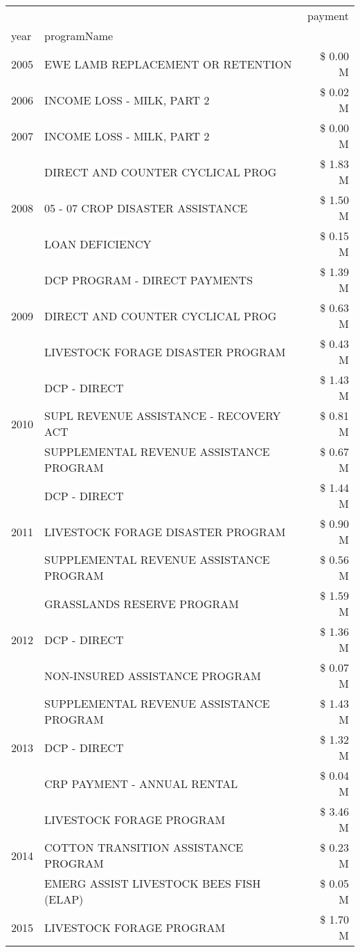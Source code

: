 \begin{tabular}{llr}
\toprule
 &  & payment \\
year & programName &  \\
\midrule
2005 & EWE LAMB REPLACEMENT OR RETENTION & \$ 0.00 M \\
\cline{1-3}
2006 & INCOME LOSS - MILK, PART 2 & \$ 0.02 M \\
\cline{1-3}
2007 & INCOME LOSS - MILK, PART 2 & \$ 0.00 M \\
\cline{1-3}
\multirow[t]{3}{*}{2008} & DIRECT AND COUNTER CYCLICAL PROG & \$ 1.83 M \\
 & 05 - 07 CROP DISASTER ASSISTANCE & \$ 1.50 M \\
 & LOAN DEFICIENCY & \$ 0.15 M \\
\cline{1-3}
\multirow[t]{3}{*}{2009} & DCP PROGRAM - DIRECT PAYMENTS & \$ 1.39 M \\
 & DIRECT AND COUNTER CYCLICAL PROG & \$ 0.63 M \\
 & LIVESTOCK FORAGE DISASTER  PROGRAM & \$ 0.43 M \\
\cline{1-3}
\multirow[t]{3}{*}{2010} & DCP - DIRECT & \$ 1.43 M \\
 & SUPL REVENUE ASSISTANCE - RECOVERY ACT & \$ 0.81 M \\
 & SUPPLEMENTAL REVENUE ASSISTANCE PROGRAM & \$ 0.67 M \\
\cline{1-3}
\multirow[t]{3}{*}{2011} & DCP - DIRECT & \$ 1.44 M \\
 & LIVESTOCK FORAGE DISASTER PROGRAM & \$ 0.90 M \\
 & SUPPLEMENTAL REVENUE ASSISTANCE PROGRAM & \$ 0.56 M \\
\cline{1-3}
\multirow[t]{3}{*}{2012} & GRASSLANDS RESERVE PROGRAM & \$ 1.59 M \\
 & DCP - DIRECT & \$ 1.36 M \\
 & NON-INSURED ASSISTANCE PROGRAM & \$ 0.07 M \\
\cline{1-3}
\multirow[t]{3}{*}{2013} & SUPPLEMENTAL REVENUE ASSISTANCE PROGRAM & \$ 1.43 M \\
 & DCP - DIRECT & \$ 1.32 M \\
 & CRP PAYMENT - ANNUAL RENTAL & \$ 0.04 M \\
\cline{1-3}
\multirow[t]{3}{*}{2014} & LIVESTOCK FORAGE PROGRAM & \$ 3.46 M \\
 & COTTON TRANSITION ASSISTANCE PROGRAM & \$ 0.23 M \\
 & EMERG ASSIST LIVESTOCK BEES FISH (ELAP) & \$ 0.05 M \\
\cline{1-3}
\multirow[t]{3}{*}{2015} & LIVESTOCK FORAGE PROGRAM & \$ 1.70 M \\

\end{tabular}
